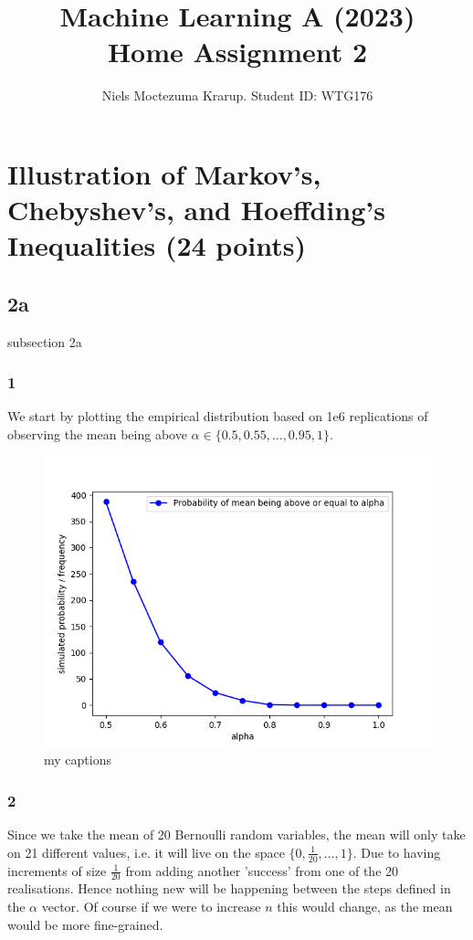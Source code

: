 \documentclass[a4paper,12pt]{article}
\begin{document}
\title{Machine Learning A (2023)\\Home Assignment 2}
\author{\color{red}Niels Moctezuma Krarup. Student ID: WTG176}
\date{}
\maketitle

\tableofcontents %
\newpage %

\section{Illustration of Markov's, Chebyshev's, and Hoeffding's Inequalities (24 points)}

\subsection*{2a}
subsection 2a
\subsubsection*{1}
We start by plotting the empirical distribution based on 1e6 replications of observing the mean being above $\alpha \in \{0.5, 0.55,\dots , 0.95, 1\}$.

\begin{figure}[htbp]
    \centering
    \includegraphics[width=0.5\linewidth]{HA2_2a_1.png}
    \caption{my captions} %
    \label{fig:placeholder}
\end{figure}


\subsubsection*{2}
Since we take the mean of 20 Bernoulli random variables, the mean will only take on 21 different values, i.e. it will live on the space $\{0, \frac{1}{20},\dots , 1\}$. Due to having increments of size $\frac{1}{20}$ from adding another 'success' from one of the 20 realisations. Hence nothing new will be happening between the steps defined in the $\alpha$ vector. Of course if we were to increase $n$ this would change, as the mean would be more fine-grained.
\end{document}
